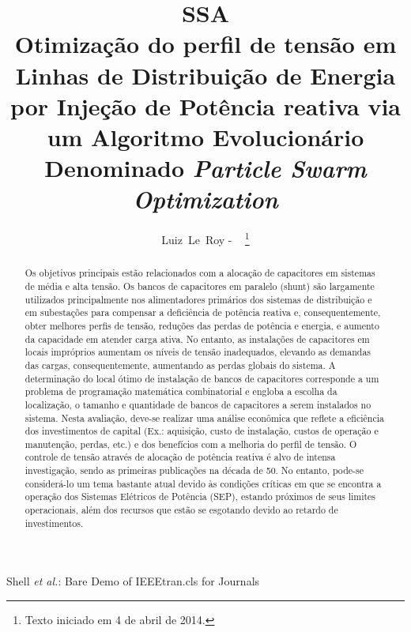 \documentclass{IEEEtran}
\begin{document}
\title{SSA\\Otimização do perfil de tensão em Linhas de Distribuição de Energia por Injeção de Potência reativa via um Algoritmo Evolucionário Denominado \textit{Particle Swarm Optimization}}
%
%
%

\author{Luiz~Le~Roy - ~
\thanks{Texto iniciado em 4 de abril de 2014.}}

%
{Shell \MakeLowercase{\textit{et al.}}: Bare Demo of IEEEtran.cls for Journals}

\maketitle

\begin{abstract}
Os objetivos principais estão relacionados com a alocação de capacitores em sistemas de média e alta tensão. Os bancos de capacitores em paralelo (shunt) são largamente utilizados principalmente nos alimentadores primários dos sistemas de distribuição e em subestações para compensar a deficiência de potência reativa e, consequentemente, obter melhores perfis de tensão, reduções das perdas de potência e energia, e aumento da capacidade em atender carga ativa. No entanto, as instalações de capacitores em locais impróprios aumentam os níveis de tensão inadequados, elevando as demandas das cargas, consequentemente, aumentando as perdas globais do sistema.
A determinação do local ótimo de instalação de bancos de capacitores corresponde a um problema de programação matemática combinatorial e engloba a escolha da localização, o tamanho e quantidade de bancos de capacitores a serem instalados no sistema. Nesta avaliação, deve-se realizar uma análise econômica que reflete a eficiência dos investimentos de capital (Ex.: aquisição, custo de instalação, custos de operação e manutenção, perdas, etc.) e dos benefícios com a melhoria do perfil de tensão.
O controle de tensão através de alocação de potência reativa é alvo de intensa investigação, sendo as primeiras publicações na década de 50. No entanto, pode-se considerá-lo um tema bastante atual devido às condições críticas em que se encontra a operação dos Sistemas Elétricos de Potência (SEP), estando próximos de seus limites operacionais, além dos recursos que estão se esgotando devido ao retardo de investimentos.

\end{abstract}
\end{document}

